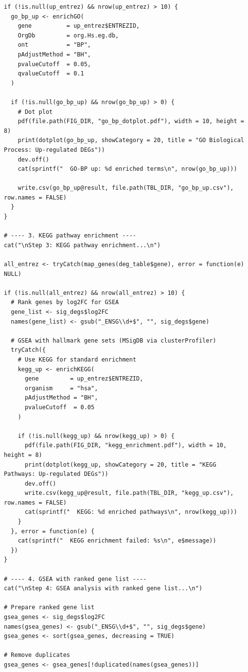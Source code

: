 \documentclass[12pt,a4paper]{ctexart}
\begin{document}
\begin{lstlisting}[caption={07_association_analysis}, basicstyle=\ttfamily\scriptsize]
if (!is.null(up_entrez) && nrow(up_entrez) > 10) {
  go_bp_up <- enrichGO(
    gene          = up_entrez$ENTREZID,
    OrgDb         = org.Hs.eg.db,
    ont           = "BP",
    pAdjustMethod = "BH",
    pvalueCutoff  = 0.05,
    qvalueCutoff  = 0.1
  )

  if (!is.null(go_bp_up) && nrow(go_bp_up) > 0) {
    # Dot plot
    pdf(file.path(FIG_DIR, "go_bp_dotplot.pdf"), width = 10, height = 8)
    print(dotplot(go_bp_up, showCategory = 20, title = "GO Biological Process: Up-regulated DEGs"))
    dev.off()
    cat(sprintf("  GO-BP up: %d enriched terms\n", nrow(go_bp_up)))

    write.csv(go_bp_up@result, file.path(TBL_DIR, "go_bp_up.csv"), row.names = FALSE)
  }
}

# ---- 3. KEGG pathway enrichment ----
cat("\nStep 3: KEGG pathway enrichment...\n")

all_entrez <- tryCatch(map_genes(deg_table$gene), error = function(e) NULL)

if (!is.null(all_entrez) && nrow(all_entrez) > 10) {
  # Rank genes by log2FC for GSEA
  gene_list <- sig_degs$log2FC
  names(gene_list) <- gsub("_ENSG\\d+$", "", sig_degs$gene)

  # GSEA with hallmark gene sets (MSigDB via clusterProfiler)
  tryCatch({
    # Use KEGG for standard enrichment
    kegg_up <- enrichKEGG(
      gene         = up_entrez$ENTREZID,
      organism     = "hsa",
      pAdjustMethod = "BH",
      pvalueCutoff  = 0.05
    )

    if (!is.null(kegg_up) && nrow(kegg_up) > 0) {
      pdf(file.path(FIG_DIR, "kegg_enrichment.pdf"), width = 10, height = 8)
      print(dotplot(kegg_up, showCategory = 20, title = "KEGG Pathways: Up-regulated DEGs"))
      dev.off()
      write.csv(kegg_up@result, file.path(TBL_DIR, "kegg_up.csv"), row.names = FALSE)
      cat(sprintf("  KEGG: %d enriched pathways\n", nrow(kegg_up)))
    }
  }, error = function(e) {
    cat(sprintf("  KEGG enrichment failed: %s\n", e$message))
  })
}

# ---- 4. GSEA with ranked gene list ----
cat("\nStep 4: GSEA analysis with ranked gene list...\n")

# Prepare ranked gene list
gsea_genes <- sig_degs$log2FC
names(gsea_genes) <- gsub("_ENSG\\d+$", "", sig_degs$gene)
gsea_genes <- sort(gsea_genes, decreasing = TRUE)

# Remove duplicates
gsea_genes <- gsea_genes[!duplicated(names(gsea_genes))]


\end{lstlisting}
\end{document}
